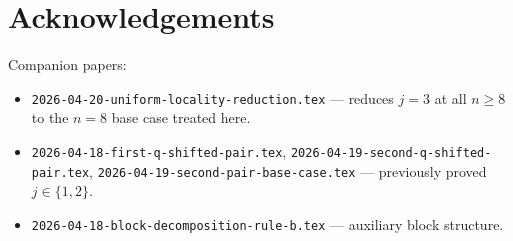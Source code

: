 \documentclass[11pt]{article}
\theoremstyle{definition}
\begin{document}
\section*{Acknowledgements}

Companion papers:
\begin{itemize}
\item \texttt{2026-04-20-uniform-locality-reduction.tex} --- reduces $j = 3$ at all $n \geq 8$ to the $n = 8$ base case treated here.
\item \texttt{2026-04-18-first-q-shifted-pair.tex}, \texttt{2026-04-19-second-q-shifted-pair.tex}, \texttt{2026-04-19-second-pair-base-case.tex} --- previously proved $j \in \{1, 2\}$.
\item \texttt{2026-04-18-block-decomposition-rule-b.tex} --- auxiliary block structure.
\end{itemize}
\end{document}
